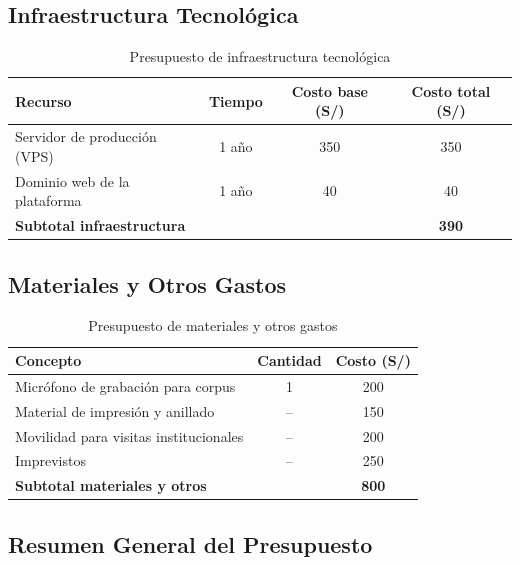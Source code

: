 \documentclass[12pt,a4paper,oneside]{article}
\begin{document}
\subsection{Infraestructura Tecnol\'ogica}

\begin{table}[H]
\centering
\caption{Presupuesto de infraestructura tecnol\'ogica}
\begin{tabular}{|p{4cm}|c|c|c|}
\hline
\rowcolor{gray!20}
\textbf{Recurso} & \textbf{Tiempo} & \textbf{Costo base (S/)} & \textbf{Costo total (S/)} \\
\hline
Servidor de producci\'on (VPS) & 1 a\~no & 350 & 350 \\
\hline
Dominio web de la plataforma & 1 a\~no & 40 & 40 \\
\hline
\textbf{Subtotal infraestructura} & & & \textbf{390} \\
\hline
\end{tabular}
\label{tab:presupuesto_infra}
\end{table}

\subsection{Materiales y Otros Gastos}

\begin{table}[H]
\centering
\caption{Presupuesto de materiales y otros gastos}
\begin{tabular}{|p{5cm}|c|c|}
\hline
\rowcolor{gray!20}
\textbf{Concepto} & \textbf{Cantidad} & \textbf{Costo (S/)} \\
\hline
Micr\'ofono de grabaci\'on para corpus & 1 & 200 \\
\hline
Material de impresi\'on y anillado & -- & 150 \\
\hline
Movilidad para visitas institucionales & -- & 200 \\
\hline
Imprevistos & -- & 250 \\
\hline
\textbf{Subtotal materiales y otros} & & \textbf{800} \\
\hline
\end{tabular}
\label{tab:presupuesto_materiales}
\end{table}

\subsection{Resumen General del Presupuesto}
\end{document}
